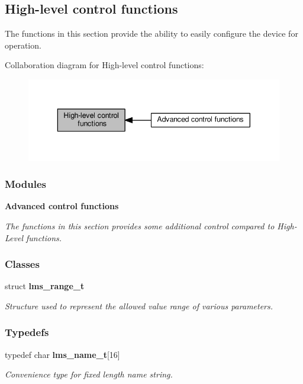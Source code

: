 \subsection{High-\/level control functions}
\label{group__FN__HIGH__LVL}


The functions in this section provide the ability to easily configure the device for operation.  


Collaboration diagram for High-\/level control functions\+:
\nopagebreak
\begin{figure}[H]
\begin{center}
\leavevmode
\includegraphics[width=343pt]{d8/d80/group__FN__HIGH__LVL}
\end{center}
\end{figure}
\subsubsection*{Modules}
\begin{DoxyCompactItemize}
\item 
{\bf Advanced control functions}
\begin{DoxyCompactList}\small\item\em The functions in this section provides some additional control compared to High-\/\+Level functions. \end{DoxyCompactList}\end{DoxyCompactItemize}
\subsubsection*{Classes}
\begin{DoxyCompactItemize}
\item 
struct {\bf lms\+\_\+range\+\_\+t}
\begin{DoxyCompactList}\small\item\em Structure used to represent the allowed value range of various parameters. \end{DoxyCompactList}\end{DoxyCompactItemize}
\subsubsection*{Typedefs}
\begin{DoxyCompactItemize}
\item 
typedef char {\bf lms\+\_\+name\+\_\+t}[16]
\begin{DoxyCompactList}\small\item\em Convenience type for fixed length name string. \end{DoxyCompactList}\end{DoxyCompactItemize}

